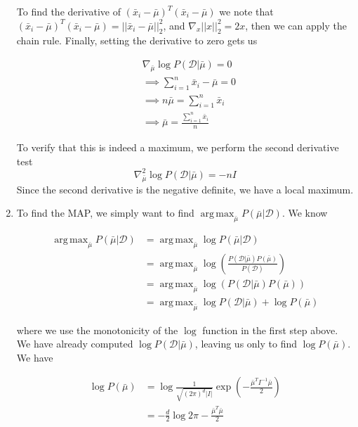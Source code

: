 \documentclass[11pt]{article}
\DeclareMathOperator*{\argmax}{arg\,max}
\begin{document}
\begin{enumerate}
		    To find the derivative of $(\bar{x}_i - \bar{\mu})^T(\bar{x}_i - \bar{\mu})$ we note that $(\bar{x}_i - \bar{\mu})^T(\bar{x}_i - \bar{\mu}) = ||\bar{x}_i - \bar{\mu}||^2_2$, and 
		    $\nabla_x ||x||^2_2 = 2x$, then we can apply the chain rule. Finally, setting the derivative to zero gets us 
		    
		    \begin{align*}
		        &\nabla_{\bar{\mu}} \log P(\mathcal{D} | \bar{\mu}) = 0 \\
		        &\implies \sum_{i=1}^n \bar{x}_i - \bar{\mu}  = 0 \\
		        &\implies n \bar{\mu} = \sum_{i=1}^n \bar{x}_i \\ 
		        &\implies \boxed{\bar{\mu} = \frac{\sum_{i=1}^n \bar{x}_i}{n}}
		    \end{align*}
		    
		    To verify that this is indeed a maximum, we perform the second derivative test
		    \[\nabla_{\bar{\mu}}^2 \log P(\mathcal{D} | \bar{\mu}) = -nI \]
		    Since the second derivative is the negative definite, we have a local maximum.
		\item To find the MAP, we simply want to find $\argmax_{\bar{\mu}} P(\bar{\mu} | \mathcal{D})$. We know 
		
		\begin{align*}
		    \argmax_{\bar{\mu}} P(\bar{\mu} | \mathcal{D}) &= \argmax_{\bar{\mu}} \log P(\bar{\mu} | \mathcal{D}) \\ 
		    &= \argmax_{\bar{\mu}}  \log \left ( \frac{P(\mathcal{D} | \bar{\mu}) P(\bar{\mu})}{P(\mathcal{D})} \right ) \\
		    &= \argmax_{\bar{\mu}} \log ( P(\mathcal{D} | \bar{\mu}) P(\bar{\mu}) ) \\ 
		    &= \argmax_{\bar{\mu}} \log P(\mathcal{D} | \bar{\mu}) + \log P(\bar{\mu})
		\end{align*}
		
		where we use the monotonicity of the $\log$ function in the first step above. We have already computed $\log P(\mathcal{D} | \bar{\mu})$, leaving
		us only to find $\log P(\bar{\mu})$. We have 
		
		\begin{align*}
		    \log P(\bar{\mu}) &= \log \frac{1}{\sqrt{\left (2 \pi \right )^d |I|}} \exp \left(- \frac{\bar{\mu}^TI^{-1}\bar{\mu}}{2}\right) \\
		    &= -\frac{d}{2} \log 2 \pi - \frac{\bar{\mu}^T\bar{\mu}}{2}
		\end{align*}
		

\end{enumerate}
\end{document}
